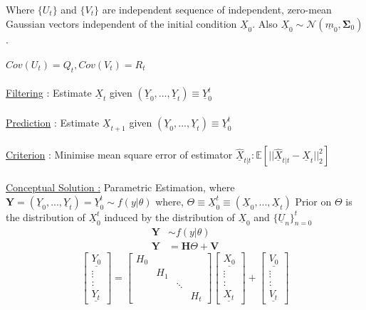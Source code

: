 \documentclass[a4paper,english,12pt]{article}
\begin{document}
  Where $\{U_t\}$ and $\{V_t\}$ are independent sequence of independent, zero-mean Gaussian vectors  independent of the initial condition $\underline{X}_0$. Also $\underline{X}_0 \sim \mathcal{N}(\underline{m}_0,\mathbf{\Sigma}_0)$.\\\\
  $Cov(U_t)=Q_t, Cov(V_t)=R_t$\\\\
  \underline{Filtering} : Estimate $\underline{X}_t$ given $(\underline{Y}_0,...,\underline{Y}_t) \equiv \underline{Y}_0^t$\\\\
  \underline{Prediction} : Estimate $\underline{X}_{t+1}$ given $(\underline{Y}_0,...,\underline{Y}_t) \equiv \underline{Y}_0^t$\\\\
  \underline{Criterion} : Minimise mean square error of estimator $\underline{\hat{X}}_{t|t} : \mathbb{E}[||\underline{\hat{X}}_{t|t} - \underline{X}_t||_2^2]$\\\\
  \underline{Conceptual Solution :} Parametric Estimation, where
  $\textbf{Y}=(\underline{Y}_0,...,\underline{Y}_t)=\underline{Y}_0^t\sim f(y|\theta)$
  where, $\Theta \equiv \underline{X}_0^t \equiv (\underline{X}_0,...,\underline{X}_t)$
  Prior on $\Theta$ is the distribution of $\underline{X}_0^t$ induced by the distribution of 
  $\underline{X}_0$ and $\{\underline{U}_n\}_{n=0}^t$
  \begin{align}
  \textbf{Y}&\sim f(y|\theta)\\
  \textbf{Y} &= \textbf{H}\Theta + \textbf{V}
  \end{align}
  \begin{equation}
   \left[\begin{array}{c}
         \underline{Y_0}\\
         \vdots\\
         \colon\\
         \underline{Y_t}
        \end{array}\right] = 
       \left[\begin{array}{cccc}
         H_0\\
         \ & H_1\\
         \ &\ &\ddots\\
         \ &\ &\ &H_t
        \end{array}\right] 
        \left[\begin{array}{c}
         \underline{X_0}\\
         \vdots\\
         \colon\\
         \underline{X_t}
        \end{array}\right] + 
        \left[\begin{array}{c}
         \underline{V_0}\\
         \vdots\\
         \colon\\
         \underline{V_t}
        \end{array}\right]
 \end{equation}\\
\end{document}

